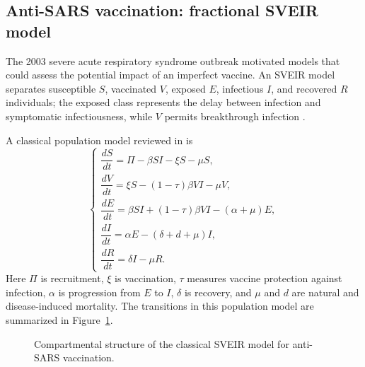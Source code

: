 \documentclass[00-main.tex]{subfiles}
\begin{document}
\subsection{Anti-SARS vaccination: fractional SVEIR model}

The 2003 severe acute respiratory syndrome outbreak motivated models that could assess the potential impact of an imperfect vaccine.
An SVEIR model separates susceptible $S$, vaccinated $V$, exposed $E$, infectious $I$, and recovered $R$ individuals; the exposed class represents the delay between infection and symptomatic infectiousness, while $V$ permits breakthrough infection \cite{Ch21,Gumel06}.

A classical population model reviewed in \cite{Ch21} is
\[
\begin{cases}
 \dfrac{dS}{dt}=\Pi-\beta SI-\xi S-\mu S,\\[8pt]
 \dfrac{dV}{dt}=\xi S-(1-\tau)\beta VI-\mu V,\\[8pt]
 \dfrac{dE}{dt}=\beta SI+(1-\tau)\beta VI-(\alpha+\mu)E,\\[8pt]
 \dfrac{dI}{dt}=\alpha E-(\delta+d+\mu)I,\\[8pt]
 \dfrac{dR}{dt}=\delta I-\mu R.
\end{cases}
\]
Here $\Pi$ is recruitment, $\xi$ is vaccination, $\tau$ measures vaccine protection against infection, $\alpha$ is progression from $E$ to $I$, $\delta$ is recovery, and $\mu$ and $d$ are natural and disease-induced mortality.
The transitions in this population model are summarized in Figure~\ref{fig:sars-sveir}.

\begin{figure}[htbp]
\centering
{}
\caption{Compartmental structure of the classical SVEIR model for anti-SARS vaccination.}
\label{fig:sars-sveir}
\end{figure}
\end{document}
